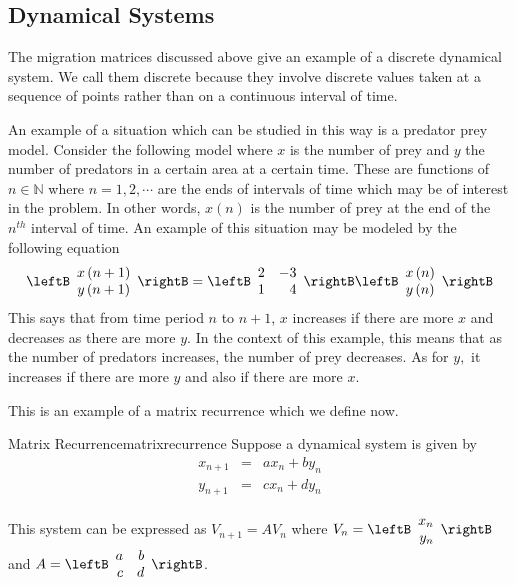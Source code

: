 \subsection{Dynamical Systems}

The migration matrices discussed above give an example of a discrete
dynamical system. We call them discrete because they involve discrete values taken at a sequence of
points rather than on a continuous interval of time. 

An example of a situation
which can be studied in this way is a predator prey model. Consider the
following model where $x$ is the number of prey and $y$ the number of
predators in a certain area at a certain time. These are functions of $n\in \mathbb{N}$ where $n=1,2,\cdots $ are
the ends of intervals of time which may be of interest in the problem. In other words, $x \left( n \right)$ is the number 
of prey at the end of the $n^{th}$ interval of time.
An example of this situation may be modeled by the following equation
\begin{equation*}
\leftB
\begin{array}{c}
x\left( n+1\right) \\
y\left( n+1\right)
\end{array}
\rightB =\leftB
\begin{array}{rr}
2 & -3 \\
1 & 4
\end{array}
\rightB \leftB
\begin{array}{c}
x\left( n\right) \\
y\left( n\right)
\end{array}
\rightB
\end{equation*}
This says that from time period $n$ to $n+1$, $x$ increases if there are more $x$ and decreases as there
are more $y$. In the context of this example, this means that as the number of predators increases,
the number of prey decreases. As for $y,$ it increases if there are more $y$ and also if
there are more $x$.

This is an example of a matrix recurrence which we define now. 

\begin{definition}{Matrix Recurrence}{matrixrecurrence}
Suppose a dynamical system is given by  
\begin{eqnarray*}
x_{n+1} &=& a x_n + b y_n \\
y_{n+1} &=& c x_n + d y_n
\end{eqnarray*}

This system can be expressed as $V_{n+1} = A V_{n}$ where $V_{n} = \leftB \begin{array}{r}
x_n \\
y_n
\end{array}
\rightB$ and $A = \leftB \begin{array}{rr}
a & b \\
c & d 
\end{array} \rightB$.  
\end{definition}

